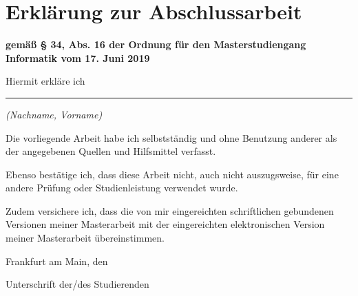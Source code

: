\chapter{Erklärung zur Abschlussarbeit}

\textbf{\small gemäß § 34, Abs. 16 der Ordnung für den Masterstudiengang Informatik vom 17. Juni 2019}

\vspace{3cm}

\noindent
Hiermit erkläre ich

\vspace{2cm}

\hrule

\smallskip

\noindent
{\small\itshape (Nachname, Vorname) }

\bigskip

\noindent
Die vorliegende Arbeit habe ich selbstständig und ohne Benutzung anderer als der angegebenen Quellen und Hilfsmittel verfasst.

\bigskip

\noindent
Ebenso bestätige ich, dass diese Arbeit nicht, auch nicht auszugsweise, für eine andere Prüfung oder Studienleistung verwendet wurde.

\bigskip

\noindent
Zudem versichere ich, dass die von mir eingereichten schriftlichen gebundenen Versionen meiner Masterarbeit mit der eingereichten elektronischen Version meiner Masterarbeit übereinstimmen.

\vspace{2cm}

\noindent
Frankfurt am Main, den \hspace{3cm}

\bigskip

\hspace{5cm}\hrulefill

\hspace{6cm}Unterschrift der/des Studierenden
